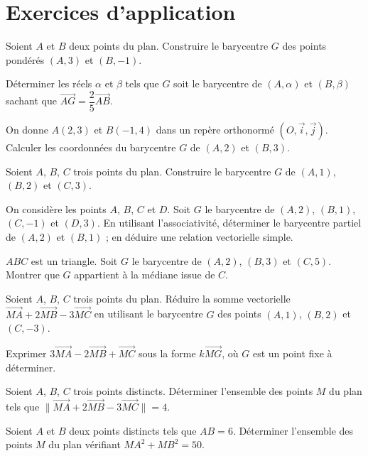 \section{Exercices d'application}


\exo{}
Soient $A$ et $B$ deux points du plan. Construire le barycentre $G$ des points pondérés $(A,3)$ et $(B,-1)$.

\exo{}
Déterminer les réels $\alpha$ et $\beta$ tels que $G$ soit le barycentre de $(A,\alpha)$ et $(B,\beta)$ sachant que $\overrightarrow{AG} = \dfrac{2}{5}\overrightarrow{AB}$.

\exo{}
On donne $A(2,3)$ et $B(-1,4)$ dans un repère orthonormé $(O,\vec{i},\vec{j})$. Calculer les coordonnées du barycentre $G$ de $(A,2)$ et $(B,3)$.


\exo{}
Soient $A$, $B$, $C$ trois points du plan. Construire le barycentre $G$ de $(A,1)$, $(B,2)$ et $(C,3)$.

\exo{}
On considère les points $A$, $B$, $C$ et $D$. Soit $G$ le barycentre de $(A,2)$, $(B,1)$, $(C,-1)$ et $(D,3)$. En utilisant l'associativité, déterminer le barycentre partiel de $(A,2)$ et $(B,1)$ ; en déduire une relation vectorielle simple.

\exo{}
$ABC$ est un triangle. Soit $G$ le barycentre de $(A,2)$, $(B,3)$ et $(C,5)$. Montrer que $G$ appartient à la médiane issue de $C$.


\exo{}
Soient $A$, $B$, $C$ trois points du plan. Réduire la somme vectorielle $\overrightarrow{MA} + 2\overrightarrow{MB} - 3\overrightarrow{MC}$ en utilisant le barycentre $G$ des points $(A,1)$, $(B,2)$ et $(C,-3)$.

\exo{}
Exprimer $3\overrightarrow{MA} - 2\overrightarrow{MB} + \overrightarrow{MC}$ sous la forme $k\overrightarrow{MG}$, où $G$ est un point fixe à déterminer.

\exo{}
Soient $A$, $B$, $C$ trois points distincts. Déterminer l'ensemble des points $M$ du plan tels que $\|\overrightarrow{MA} + 2\overrightarrow{MB} - 3\overrightarrow{MC}\| = 4$.


\exo{}
Soient $A$ et $B$ deux points distincts tels que $AB = 6$. Déterminer l'ensemble des points $M$ du plan vérifiant $MA^2 + MB^2 = 50$.

